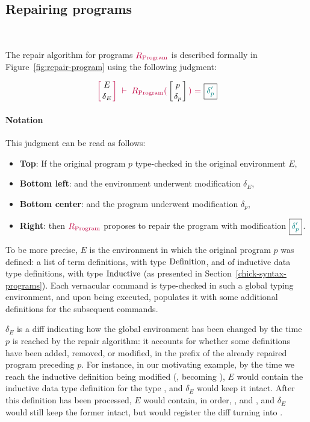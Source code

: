 \subsection{Repairing programs}~\label{repair-program}

The repair algorithm for programs $\textcolor{purple}{R_{\text{Program}}}$ is described formally in
Figure~\ref{fig:repair-program} using the following judgment:

{
  \[
    {\turnstile
      {\denv{E}{\delta_E}}
      {\repairProg{p}{\delta_p}{\delta_p'}}
    }
  \]
}

\paragraph{Notation} This judgment can be read as follows:
\begin{itemize}
\item \textbf{Top}: If the original program $p$ type-checked in the original environment $E$,
\item \textbf{Bottom left}: and the environment underwent modification $\delta_{E}$,
\item \textbf{Bottom center}: and the program underwent modification $\delta_{p}$,
\item \textbf{Right}: then $\textcolor{purple}{R_{\text{Program}}}$ proposes to repair the program with modification $\boxed{ \textcolor{teal}{\delta'_{p}} }$.
\end{itemize}

To be more precise, $E$ is the environment in which the original program $p$ was
defined: a list of term definitions, with type $\text{Definition}$, and of
inductive data type definitions, with type $\text{Inductive}$ (as presented
in Section~\ref{chick-syntax-programs}).  Each vernacular command is
type-checked in such a global typing environment, and upon being executed,
populates it with some additional definitions for the subsequent commands.

$\delta_E$ is a diff indicating how the global environment has been changed by
the time $p$ is reached by the repair algorithm: it accounts for whether some
definitions have been added, removed, or modified, in the prefix of the already
repaired program preceding $p$.  For instance, in our motivating example, by the
time we reach the inductive definition being modified (,
becoming ), $E$ would contain the inductive data type definition
for the type , and $\delta_E$ would keep it intact.  After this
definition has been processed, $E$ would contain, in order, , and
, and $\delta_E$ would still keep the former intact, but would
register the diff turning  into .


